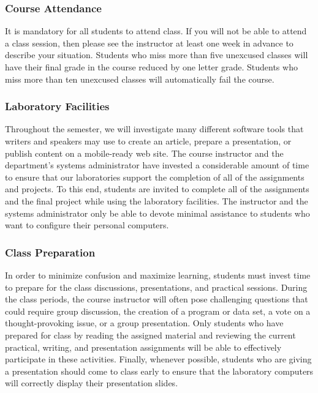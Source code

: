 \vspace*{-.1in}
\subsubsection*{Course Attendance}

It is mandatory for all students to attend class. If you will not be able to attend a class session, then please see
the instructor at least one week in advance to describe your situation. Students who miss more than five unexcused
classes will have their final grade in the course reduced by one letter grade. Students who miss more than ten
unexcused classes will automatically fail the course.

\vspace*{-.1in}
\subsubsection*{Laboratory Facilities}

Throughout the semester, we will investigate many different software tools that writers and speakers may use to create
an article, prepare a presentation, or publish content on a mobile-ready web site. The course instructor and the
department's systems administrator have invested a considerable amount of time to ensure that our laboratories support
the completion of all of the assignments and projects. To this end, students are invited to complete all of the
assignments and the final project while using the laboratory facilities. The instructor and the systems administrator
only be able to devote minimal assistance to students who want to configure their personal computers.

\vspace*{-.1in}
\subsubsection*{Class Preparation}

In order to minimize confusion and maximize learning, students must invest time to prepare for the class discussions,
presentations, and practical sessions. During the class periods, the course instructor will often pose challenging
questions that could require group discussion, the creation of a program or data set, a vote on a thought-provoking
issue, or a group presentation. Only students who have prepared for class by reading the assigned material and reviewing
the current practical, writing, and presentation assignments will be able to effectively participate in these
activities. Finally, whenever possible, students who are giving a presentation should come to class early to ensure that
the laboratory computers will correctly display their presentation slides.

